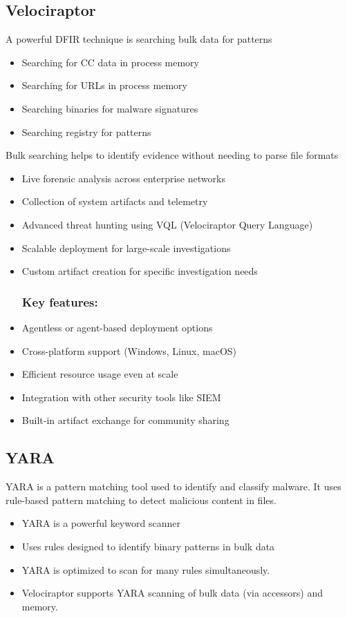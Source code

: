 \subsection{Velociraptor}

A powerful DFIR technique is searching bulk data for patterns
\begin{itemize}
  \item Searching for CC data in process memory
  \item Searching for URLs in process memory
  \item Searching binaries for malware signatures
  \item Searching registry for patterns
\end{itemize}
Bulk searching helps to identify evidence without needing to parse file formats

\begin{itemize}
  \item Live forensic analysis across enterprise networks
  \item Collection of system artifacts and telemetry
  \item Advanced threat hunting using VQL (Velociraptor Query Language)
  \item Scalable deployment for large-scale investigations
  \item Custom artifact creation for specific investigation needs
  \subsubsection*{Key features:}
  \item Agentless or agent-based deployment options
  \item Cross-platform support (Windows, Linux, macOS)
  \item Efficient resource usage even at scale
  \item Integration with other security tools like SIEM
  \item Built-in artifact exchange for community sharing
\end{itemize}

\subsection{YARA}
YARA is a pattern matching tool used to identify and classify malware. It uses rule-based pattern matching to detect malicious content in files.
\begin{itemize}
  \item YARA is a powerful keyword scanner
  \item Uses rules designed to identify binary patterns in bulk data
  \item YARA is optimized to scan for many rules simultaneously.
  \item Velociraptor supports YARA scanning of bulk data (via accessors) and memory.
\end{itemize}


